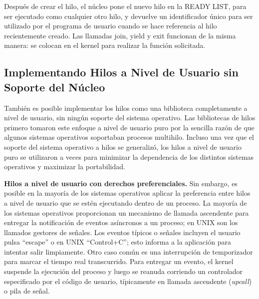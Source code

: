 \documentclass[10pt]{book}
\begin{document}
Después de crear el hilo, el núcleo pone el nuevo hilo en la READY LIST, para ser ejecutado como cualquier otro hilo, y devuelve un identificador único para ser utilizado por el programa de usuario cuando se hace referencia al hilo recientemente creado. Las llamadas {\mf join}, {\mf yield} y {\mf exit} funcionan de la misma manera: se colocan en el kernel para realizar la función solicitada.

\subsection{Implementando Hilos a Nivel de Usuario sin Soporte del Núcleo}
También es posible implementar los hilos como una biblioteca completamente a nivel de usuario, sin ningún soporte del sistema operativo. Las bibliotecas de hilos primero tomaron este enfoque a nivel de usuario puro por la sencilla razón de que algunos sistemas operativos soportaban procesos multihilo. Incluso una vez que el soporte del sistema operativo a hilos se generalizó, los hilos a nivel de usuario puro se utilizaron a veces para minimizar la dependencia de los distintos sistemas operativos y maximizar la portabilidad.

\textbf{Hilos a nivel de usuario con derechos preferenciales.} Sin embargo, es posible en la mayoría de los sistemas operativos aplicar la preferencia entre hilos a nivel de usuario que se estén ejecutando dentro de un proceso. La mayoría de los sistemas operativos proporcionan un mecanismo de llamada ascendente para entregar la notificación de eventos asíncronos a un proceso; en UNIX son los llamados gestores de señales. Los eventos típicos o señales incluyen el usuario pulsa ``escape'' o en UNIX ``Control+C''; esto informa a la aplicación para intentar salir limpiamente. Otro caso común es una interrupción de temporizador para marcar el tiempo real transcurrido. Para entregar un evento, el kernel suspende la ejecución del proceso y luego se reanuda corriendo un controlador especificado por el código de usuario, típicamente en llamada ascendente (\textit{upcall}) o pila de señal.
\end{document}
